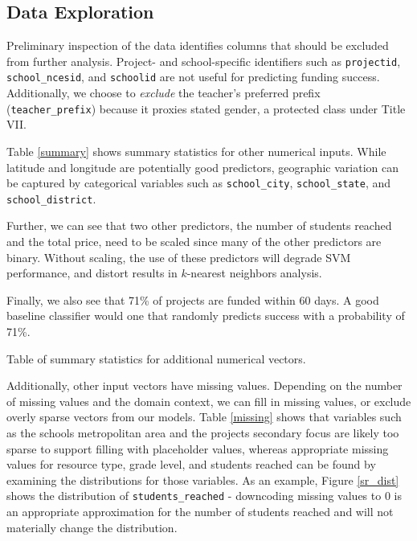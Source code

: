 \documentclass[11pt]{article}
\begin{document}
\subsection{Data Exploration}
Preliminary inspection of the data identifies columns that should be excluded from further analysis. Project- and school-specific identifiers such as \texttt{projectid},  \texttt{school\_ncesid}, and \texttt{schoolid} are not useful for predicting funding success. Additionally, we choose to \textit{exclude} the teacher's preferred prefix (\texttt{teacher\_prefix}) because it proxies stated gender, a protected class under Title VII. 

Table \ref{summary} shows summary statistics for other numerical inputs. While latitude and longitude are potentially good predictors, geographic variation can be captured by categorical variables such as \texttt{school\_city}, \texttt{school\_state}, and \texttt{school\_district}. 

Further, we can see that two other predictors, the number of students reached and the total price, need to be scaled since many of the other predictors are binary. Without scaling, the use of these predictors will degrade SVM performance, and distort results in $k$-nearest neighbors analysis.

Finally, we also see that 71\% of projects are funded within 60 days. A good baseline classifier would one that randomly predicts success with a probability of 71\%.
\begin{table}[H]
\centering \small \renewcommand{\arraystretch}{1.1}

\caption{Table of summary statistics for additional numerical vectors.}\label{summary}
\end{table}

Additionally, other input vectors have missing values. Depending on the number of missing values and the domain context, we can fill in missing values, or exclude overly sparse vectors from our models. Table \ref{missing} shows that variables such as the schools metropolitan area and the projects secondary focus are likely too sparse to support filling with placeholder values, whereas appropriate missing values for resource type, grade level, and students reached can be found by examining the distributions for those variables. As an example, Figure \ref{sr_dist} shows the distribution of \texttt{students\_reached} - downcoding missing values to 0 is an appropriate approximation for the number of students reached and will not materially change the distribution.
\end{document}
